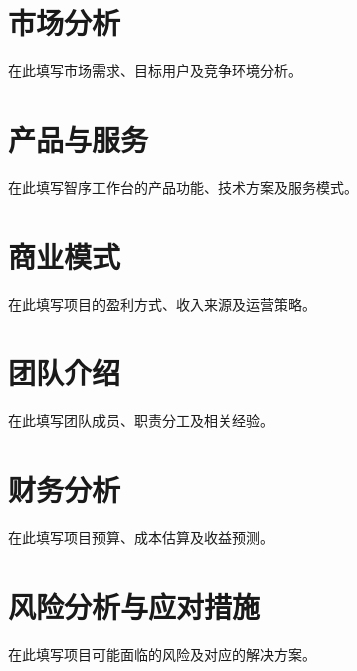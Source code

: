 \documentclass[12pt,a4paper]{ctexart}
\begin{document}
\section{市场分析}

在此填写市场需求、目标用户及竞争环境分析。

\section{产品与服务}

在此填写智序工作台的产品功能、技术方案及服务模式。

\section{商业模式}

在此填写项目的盈利方式、收入来源及运营策略。

\section{团队介绍}

在此填写团队成员、职责分工及相关经验。

\section{财务分析}

在此填写项目预算、成本估算及收益预测。

\section{风险分析与应对措施}

在此填写项目可能面临的风险及对应的解决方案。
\end{document}
